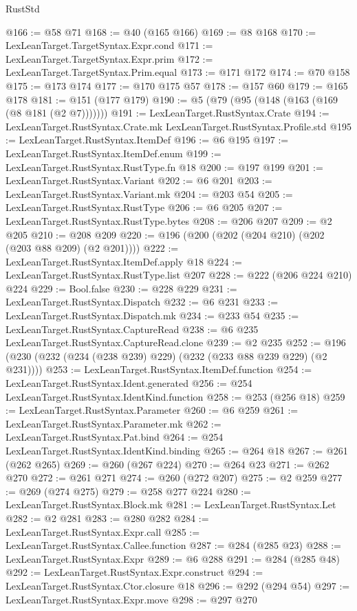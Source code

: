 \begin{lexlean}{RustStd}
\begin{coremodule}
@166 := @58 @71
@168 := @40 (@165 @166)
@169 := @8 @168
@170 := LexLeanTarget.TargetSyntax.Expr.cond
@171 := LexLeanTarget.TargetSyntax.Expr.prim
@172 := LexLeanTarget.TargetSyntax.Prim.equal
@173 := @171 @172
@174 := @70 @158
@175 := @173 @174
@177 := @170 @175 @57
@178 := @157 @60
@179 := @165 @178
@181 := @151 (@177 @179)
@190 := @5 (@79 (@95 (@148 (@163 (@169 (@8 @181 (@2 @7)))))))
@191 := LexLeanTarget.RustSyntax.Crate
@194 := LexLeanTarget.RustSyntax.Crate.mk LexLeanTarget.RustSyntax.Profile.std
@195 := LexLeanTarget.RustSyntax.ItemDef
@196 := @6 @195
@197 := LexLeanTarget.RustSyntax.ItemDef.enum
@199 := LexLeanTarget.RustSyntax.RustType.fn @18
@200 := @197 @199
@201 := LexLeanTarget.RustSyntax.Variant
@202 := @6 @201
@203 := LexLeanTarget.RustSyntax.Variant.mk
@204 := @203 @54
@205 := LexLeanTarget.RustSyntax.RustType
@206 := @6 @205
@207 := LexLeanTarget.RustSyntax.RustType.bytes
@208 := @206 @207
@209 := @2 @205
@210 := @208 @209
@220 := @196 (@200 (@202 (@204 @210) (@202 (@203 @88 @209) (@2 @201))))
@222 := LexLeanTarget.RustSyntax.ItemDef.apply @18
@224 := LexLeanTarget.RustSyntax.RustType.list @207
@228 := @222 (@206 @224 @210) @224
@229 := Bool.false
@230 := @228 @229
@231 := LexLeanTarget.RustSyntax.Dispatch
@232 := @6 @231
@233 := LexLeanTarget.RustSyntax.Dispatch.mk
@234 := @233 @54
@235 := LexLeanTarget.RustSyntax.CaptureRead
@238 := @6 @235 LexLeanTarget.RustSyntax.CaptureRead.clone
@239 := @2 @235
@252 := @196 (@230 (@232 (@234 (@238 @239) @229) (@232 (@233 @88 @239 @229) (@2 @231))))
@253 := LexLeanTarget.RustSyntax.ItemDef.function
@254 := LexLeanTarget.RustSyntax.Ident.generated
@256 := @254 LexLeanTarget.RustSyntax.IdentKind.function
@258 := @253 (@256 @18)
@259 := LexLeanTarget.RustSyntax.Parameter
@260 := @6 @259
@261 := LexLeanTarget.RustSyntax.Parameter.mk
@262 := LexLeanTarget.RustSyntax.Pat.bind
@264 := @254 LexLeanTarget.RustSyntax.IdentKind.binding
@265 := @264 @18
@267 := @261 (@262 @265)
@269 := @260 (@267 @224)
@270 := @264 @23
@271 := @262 @270
@272 := @261 @271
@274 := @260 (@272 @207)
@275 := @2 @259
@277 := @269 (@274 @275)
@279 := @258 @277 @224
@280 := LexLeanTarget.RustSyntax.Block.mk
@281 := LexLeanTarget.RustSyntax.Let
@282 := @2 @281
@283 := @280 @282
@284 := LexLeanTarget.RustSyntax.Expr.call
@285 := LexLeanTarget.RustSyntax.Callee.function
@287 := @284 (@285 @23)
@288 := LexLeanTarget.RustSyntax.Expr
@289 := @6 @288
@291 := @284 (@285 @48)
@292 := LexLeanTarget.RustSyntax.Expr.construct
@294 := LexLeanTarget.RustSyntax.Ctor.closure @18
@296 := @292 (@294 @54)
@297 := LexLeanTarget.RustSyntax.Expr.move
@298 := @297 @270

\end{coremodule}
\end{lexlean}
